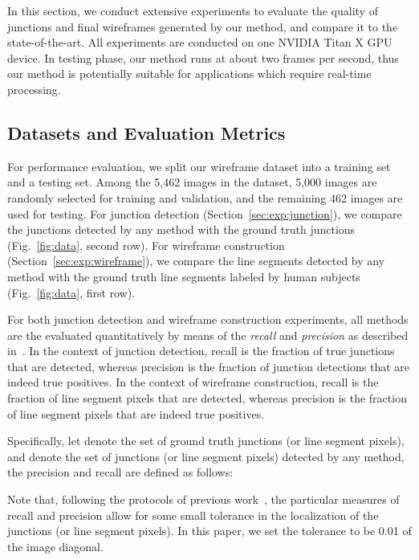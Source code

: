 \documentclass[10pt,twocolumn,letterpaper]{article}
\begin{document}
In this section, we conduct extensive experiments to evaluate the quality of junctions and final wireframes generated by our method, and compare it to the state-of-the-art. All experiments are conducted on one NVIDIA Titan X GPU device. In testing phase, our method runs at about two frames per second, thus our method is potentially suitable for applications which require real-time processing.

\subsection{Datasets and Evaluation Metrics}

For performance evaluation, we split our wireframe dataset into a training set and a testing set. Among the 5,462 images in the dataset, 5,000 images are randomly selected for training and validation, and the remaining 462 images are used for testing. For junction detection (Section~\ref{sec:exp:junction}), we compare the junctions detected by any method with the ground truth junctions (Fig.~\ref{fig:data}, second row). For wireframe construction (Section~\ref{sec:exp:wireframe}), we compare the line segments detected by any method with the ground truth line segments labeled by human subjects (Fig.~\ref{fig:data}, first row).

For both junction detection and wireframe construction experiments, all methods are the evaluated quantitatively by means of the \emph{recall} and \emph{precision} as described in~\cite{MartinFM04, MaireAFM08, XiaDG14}. In the context of junction detection, recall is the fraction of true junctions that are detected, whereas precision is the fraction of junction detections that are indeed true positives. In the context of wireframe construction, recall is the fraction of line segment pixels that are detected, whereas precision is the fraction of line segment pixels that are indeed true positives.

Specifically, let  denote the set of ground truth junctions (or line segment pixels), and  denote the set of junctions (or line segment pixels) detected by any method, the precision and recall are defined as follows:\vspace{-2mm}

Note that, following the protocols of previous work~\cite{MartinFM04, MaireAFM08, XiaDG14},  the particular measures of recall and precision allow for some small tolerance in the localization of the junctions (or line segment pixels). In this paper, we set the tolerance to be 0.01 of the image diagonal.
\end{document}
